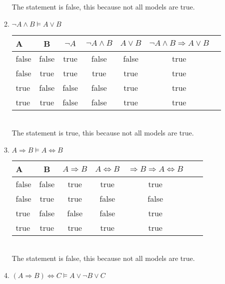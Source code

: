 \documentclass[paper=a4, fontsize=11pt]{scrartcl} %
\numberwithin{equation}{section} %
\numberwithin{figure}{section} %
\numberwithin{table}{section} %
\begin{document}
\begin{enumerate}
\begin{enumerate}
		The statement is false, this because not all models are true.\\
		
		\item %
		
		$\neg A \wedge B \models A \vee B$

		\begin{tabular}{l c c c c c c}
			\hline 
			A & B & $\neg A $ & $ \neg A \wedge B $ & $ A \vee B $ & $ \neg A \wedge B \Rightarrow A \vee B $ \\
			\hline
			false 	& false 	& true 		& false 	& false 	& true \\
			false 	& true 		& true 		& true	 	& true 		& true \\
			true 	& false 	& false 	& false 	& true 		& true \\
			true 	& true 		& false 	& false 	& true 		& true \\
		\end{tabular}
		\\
		
		The statement is true, this because not all models are true.\\
		
		\item %
		$A \Rightarrow B \models A \Leftrightarrow B$

		\begin{tabular}{l c c c c c c}
			\hline 
			A & B & $A \Rightarrow B$ & $ A \Leftrightarrow B $ & $\Rightarrow B \Rightarrow A \Leftrightarrow B $ \\
			\hline
			false 	& false 	& true 		& true 		& true  \\
			false 	& true 		& true 		& false	 	& false 	 \\
			true 	& false 	& false 	& false 	& true 	 \\
			true 	& true 		& true	 	& true 		& true 	 \\
		\end{tabular}
		\\
		
		The statement is false, this because not all models are true.\\
		
		\item %
		$(A \Rightarrow B) \Leftrightarrow C \models A \vee \neg B \vee C$


\end{enumerate}
\end{enumerate}
\end{document}
